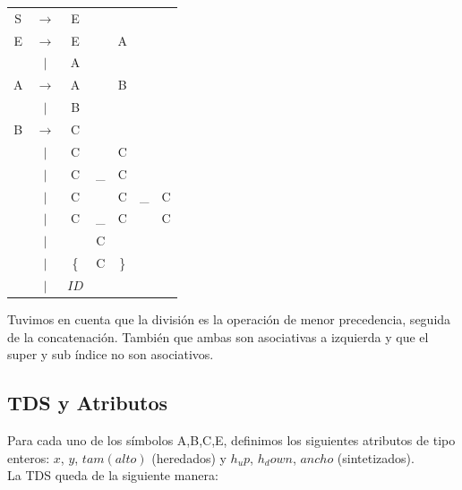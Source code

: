 \documentclass[a4paper, 10pt, twoside]{article}
\begin{document}
\begin{table}[ht]
\begin{tabular} {c c c c c c c}

S & $\rightarrow$ & E &                   &   & & \\
E & $\rightarrow$ & E & \detokenize{/}    & A & & \\
  & $|$           & A &                   &   & & \\
A & $\rightarrow$ & A &                   & B & & \\
  & $|$           & B &                   &   & & \\
B & $\rightarrow$ & C &                   &   & & \\
  & $|$           & C & \detokenize{^}    & C & & \\
  & $|$           & C & \_                & C & & \\
  & $|$           & C & \detokenize{^}    & C & \_  & C \\
  & $|$           & C & \_                & C & \detokenize{^} & C \\
  & $|$           & \detokenize{(}        & C & \detokenize{)} & & \\
  & $|$           & \{                    & C & \} & & \\
  & $|$           & $ID$                  & & & & \\

\end{tabular}
\end{table}

Tuvimos en cuenta que la división es la operación de menor precedencia, seguida de la concatenación. También que ambas son asociativas a izquierda y que el super y sub índice no son asociativos.

\subsection{TDS y Atributos}
Para cada uno de los símbolos A,B,C,E, definimos los siguientes atributos de tipo enteros: $x$, $y$, $tam (alto)$ (heredados) y $h_up$, $h_down$, $ancho$ (sintetizados). \\


La TDS queda de la siguiente manera:
\end{document}
